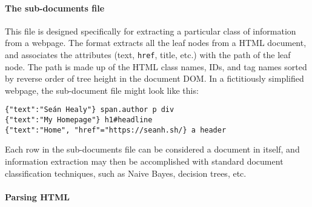 \paragraph{The sub-documents file} This file
is designed specifically for extracting a particular class of
information
from a webpage.  The format extracts all the leaf nodes from a HTML
document, and associates the attributes (text, {\tt href}, title,
etc.) with
the path of the leaf node.  The path is made up of the HTML class
names, IDs, and tag names sorted by reverse order of tree height
in the document DOM. In a fictitiously simplified webpage, the sub-document file might look
like this:
\begin{verbatim}
{"text":"Seán Healy"} span.author p div
{"text":"My Homepage"} h1#headline
{"text":"Home", "href"="https://seanh.sh/} a header
\end{verbatim}
Each row in the sub-documents file can be considered a document
in itself, and information extraction may then be accomplished with
standard document classification techniques, such as Naive Bayes,
decision trees, etc.
\paragraph{Parsing HTML}
